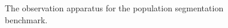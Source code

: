     
    \begin{figure}[h!]
        \begin{center}
            
            \caption{The observation apparatus for the population segmentation benchmark.}
            \label{Figure:cd-apparatus}
        \end{center}
    \end{figure}

